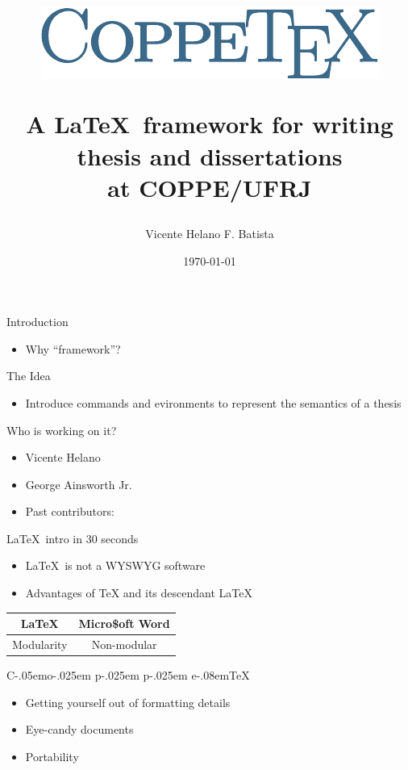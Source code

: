 \documentclass[style=coppe,mode=present,paper=a4paper]{powerdot}
\title{%
\begin{center}
\includegraphics[scale=0.5]{images/logo}
\end{center}
\begin{center}
\normalsize\fontfamily{cmr}%
A \LaTeX\ framework for writing thesis and dissertations\\
at COPPE/UFRJ
\end{center}}
\author{Vicente Helano F. Batista}
\date{\today}
\def\CoppeTeX{{\rm C\kern-.05em{\sc o\kern-.025em p\kern-.025em
p\kern-.025em e}}\kern-.08em\TeX}
\begin{document}
\maketitle

\begin{slide}{Introduction}
\vspace*{1cm}
\begin{itemize}
\item Why ``framework''?
\end{itemize}
\end{slide}

\begin{slide}{The Idea}
\vspace*{1cm}
\begin{itemize}
\item Introduce commands and evironments to represent the semantics of a thesis
\end{itemize}
\end{slide}

\begin{slide}{Who is working on it?}
\vspace*{1cm}
\begin{itemize}
\item Vicente Helano
\item George Ainsworth Jr.\pause
\item Past contributors:
\end{itemize}
\end{slide}

\begin{slide}{\LaTeX\ intro in 30 seconds}
\vspace*{1cm}
\begin{itemize}
\item \LaTeX\ is not a WYSWYG software
\item Advantages of TeX and its descendant LaTeX
\end{itemize}
\begin{center}
\begin{tabular}{cc}
\LaTeX & Micro\$oft Word\\
\hline
 Modularity & Non-modular\\
\hline
\end{tabular}
\end{center}
\end{slide}

\begin{slide}{\CoppeTeX}
\vspace*{1cm}
\begin{itemize}
\item Getting yourself out of formatting details
\item Eye-candy documents
\item Portability
\end{itemize}
\end{slide}
\end{document}
